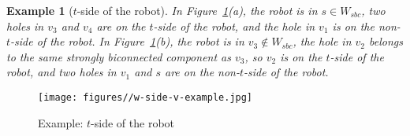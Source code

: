 \documentclass{article}
\newtheorem{exmp}[thm]{Example}
\begin{document}
\begin{exmp}[$t$-side of the robot]
In Figure~\ref{fig:w-side-v-example}(a), the robot is in $s \in
W_{sbc}$, two holes in $v_3$ and $v_4$ are on the $t$-side of the
robot, and the hole in $v_1$ is on the non-$t$-side of the robot. In
Figure~\ref{fig:w-side-v-example}(b), the robot is in $v_3 \not \in
W_{sbc}$, the hole in $v_2$ belongs to the same strongly biconnected
component as $v_3$, so $v_2$ is on the $t$-side of the robot, and
two holes in $v_1$ and $s$ are on the non-$t$-side of the robot.
\end{exmp}

\begin{figure}[ht]
\centering
  \texttt{[image: figures//w-side-v-example.jpg]}
  \caption{Example: $t$-side of the robot}\label{fig:w-side-v-example}
\end{figure}
\end{document}
